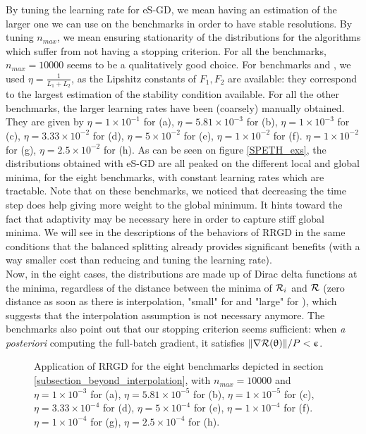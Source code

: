 \documentclass[article,authoryear,jmlmc]{beg_32}             %
\begin{document}
By tuning the learning rate for eS-GD, we mean having an estimation of the larger one we can use on the benchmarks in order to 
have stable resolutions. 
By tuning $n_{max}$, we mean ensuring stationarity of the distributions for the algorithms which suffer from not having a stopping criterion.
For all the benchmarks, $n_{max}=10000$ seems to be a qualitatively good choice. 
For benchmarks \exOne and \exTwo, we used $\eta=\frac{1}{L_1+L_2}$, as the Lipshitz constants of $F_1,F_2$ are available: they correspond to 
the largest estimation of the stability condition available. 
For all the other benchmarks, the larger learning rates have been (coarsely) manually obtained. They are given by 
 $\eta = 1   \times 10^{-1}$  for \exOne    (a), 
 $\eta = 5.81\times 10^{-3}$  for \exTwo    (b), 
 $\eta = 1   \times 10^{-3}$  for \exThree  (c), 
 $\eta = 3.33\times 10^{-2}$  for \exFour   (d), 
 $\eta = 5   \times 10^{-2}$  for \exFive   (e), 
 $\eta = 1   \times 10^{-2}$  for \exSix    (f). 
 $\eta = 1   \times 10^{-2}$  for \exSeven  (g), 
 $\eta = 2.5 \times 10^{-2}$  for \exHeight (h). 
As can be seen on figure \ref{SPETH_exs}, the distributions obtained with eS-GD are all peaked on the different local and global minima, for the eight benchmarks, with
constant learning
rates which are tractable. 
Note that on these benchmarks, we noticed that decreasing the time step does help giving more weight to the global minimum. 
It hints toward the fact that adaptivity may be necessary here in order to capture stiff global minima.  
We will see in the descriptions of the behaviors of RRGD in the same conditions that the balanced splitting already provides significant benefits (with a way smaller cost
than reducing and tuning the learning rate). \\ 
Now, in the eight cases, the distributions are made up of Dirac delta functions at the minima, regardless of the distance between the minima of $\mathcal{R}_i$ and $\mathcal{R}$ (zero distance as
soon as there is interpolation, "small" for \exThree and "large" for \exFour), which suggests that the interpolation assumption is not necessary anymore. 
The benchmarks also point out that
our stopping criterion seems sufficient: when {\em a posteriori} computing the full-batch gradient, it satisfies $\|\nabla \mathcal{R}(\uptheta)\|/P<\upepsilon$. \\
\begin{figure}[h!]
	\centering
	\scalebox{0.60}{}
	\caption{
          Application of RRGD for the eight benchmarks depicted in section \ref{subsection_beyond_interpolation}, with $n_{max}=10000$ and 
 $\eta = 1   \times 10^{-3}$  for \exOne    (a), 
 $\eta = 5.81\times 10^{-5}$  for \exTwo    (b), 
 $\eta = 1   \times 10^{-5}$  for \exThree  (c), 
 $\eta = 3.33\times 10^{-4}$  for \exFour   (d), 
 $\eta = 5   \times 10^{-4}$  for \exFive   (e), 
 $\eta = 1   \times 10^{-4}$  for \exSix    (f). 
 $\eta = 1   \times 10^{-4}$  for \exSeven  (g), 
 $\eta = 2.5 \times 10^{-4}$  for \exHeight (h). 
}
	\label{SGD_exs_001}
\end{figure}
\end{document}
